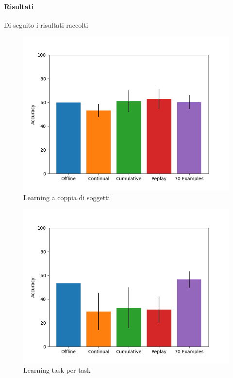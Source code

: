 \documentclass[11pt, a4paper, twoside, openright]{book}
\begin{document}
\paragraph{Risultati} Di seguito i risultati raccolti
\begin{figure}[h]
    \centering
    \includegraphics[scale=0.75]{img/autotest_20210701/autotest_GRU.png}
    \caption{Learning a coppia di soggetti}
    \label{fig:autotest_GRU}
\end{figure}
\begin{figure}[h]
    \centering
    \includegraphics[scale=0.75]{img/autotest_20210701/autotest_task_GRU.png}
    \caption{Learning task per task}
    \label{fig:autotest_task_GRU}
\end{figure}
\end{document}
